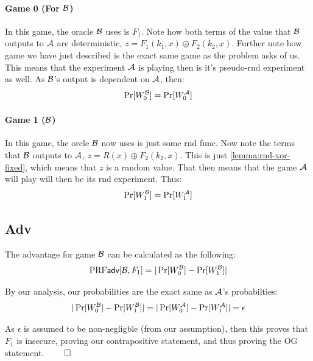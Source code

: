 \documentclass[12pt]{article}
\theoremstyle{plain}
\theoremstyle{definition}
\begin{document}
\begin{solution}
\paragraph{Game 0 (For $\mathcal{B}$)}
In this game, the oracle $\mathcal{B}$ uses is $F_1$. Note how both terms of the value that $\mathcal{B}$ outputs to $\mathcal{A}$ are deterministic, $z = F_1(k_1, x) \oplus F_2(k_2, x)$. 
Further note how game we have just described is the exact same game as the problem asks of us. This means that the experiment $\mathcal{A}$ is playing then
is it's pseudo-rnd experiment as well. As $\mathcal{B}$'s output is dependent on $\mathcal{A}$, then:
\begin{equation*}
  \Pr[W^{\mathcal{B}}_0] = \Pr[W^{\mathcal{A}}_0]
\end{equation*}

\paragraph{Game 1 ($\mathcal{B}$)}
In this game, the orcle $\mathcal{B}$ now uses is just some rnd func. Now note the terms that $\mathcal{B}$ outputs to $\mathcal{A}$, $z = R(x) \oplus F_2(k_2, x)$. 
This is just \ref{lemma:rnd-xor-fixed}, which means that $z$ is a random value. That then means that the game $\mathcal{A}$ will play will then be its rnd experiment.
Thus:
\begin{equation*}
  \Pr[W^{\mathcal{B}}_1] = \Pr[W^{\mathcal{A}}_1]
\end{equation*}

\subsection*{Adv}
The advantage for game $\mathcal{B}$ can be calculated as the following:
\begin{equation*}
  \textrm{PRF}\textsf{adv}[\mathcal{B}, F_1] = |\Pr[W^{\mathcal{B}}_0] - \Pr[W^{\mathcal{B}}_1]|
\end{equation*}

\noindent By our analysis, our probabilities are the exact same as $\mathcal{A}$'s probabilties:
\begin{equation*}
  |\Pr[W^{\mathcal{B}}_0] - \Pr[W^{\mathcal{B}}_1]| = |\Pr[W^{\mathcal{A}}_0] - \Pr[W^{\mathcal{A}}_1]| = \epsilon
\end{equation*}

\noindent As $\epsilon$ is assumed to be non-negligble (from our assumption), then this proves that $F_1$ is insecure, proving our contrapositive statement, and thus proving the OG statement. $\qed$
\end{solution}
\end{document}

